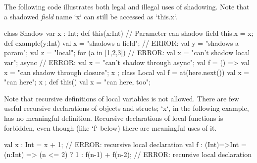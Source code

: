 \begin{ex}
The following code illustrates both legal and illegal uses of shadowing.
Note that a shadowed {\em field} name \xcd`x` can still be accessed 
as \xcd`this.x`. 

\begin{xten}
class Shadow{
  var x : Int; 
  def this(x:Int) { 
     // Parameter can shadow field
     this.x = x; 
  }
  def example(y:Int) {
     val x = "shadows a field";
     // ERROR: val y = "shadows a param";
     val z = "local";
     for (a in [1,2,3]) {
        // ERROR: val x = "can't shadow local var";
     }
     async {
        // ERROR: val x = "can't shadow through async";
     }        
     val f = () => { 
       val x = "can shadow through closure";
       x
     };
     class Local {
        val f = at(here.next()){ val x = "can here"; x };
        def this() { val x = "can here, too"; }
     }
  }
}
\end{xten}
%



\end{ex}

\begin{ex}
Note that recursive definitions of local variables is not allowed.  There are
few useful recursive declarations of objects and structs; \xcd`x`, in the
following example, has no meaningful definition.  Recursive declarations of
local functions is forbidden, even though (like \xcd`f` below) there are
meaningful uses of it.  
\begin{xten}
val x : Int = x + 1; // ERROR: recursive local declaration
val f : (Int)=>Int 
      = (n:Int) => (n <= 2) ? 1 : f(n-1) + f(n-2);
      // ERROR: recursive local declaration
\end{xten}

\end{ex}



